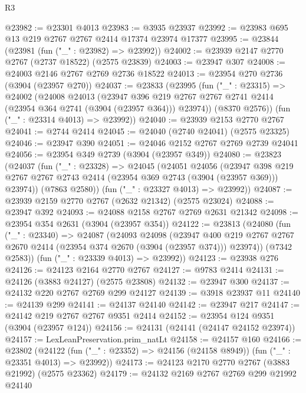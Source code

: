 \begin{lexlean}{R3}
\begin{coremodule}
@23982 := @23301 @4013
@23983 := @3935 @23937
@23992 := @23983 @695 @13 @219 @2767 @2767 @2414 @17374 @23974 @17377
@23995 := @23844 (@23981 (fun ("_" : @23982) => @23992))
@24002 := @23939 @2147 @2770 @2767 (@2737 @18522) (@2575 @23839)
@24003 := @23947 @307
@24008 := @24003 @2146 @2767 @2769 @2736 @18522
@24013 := @23954 @270 @2736 (@3904 (@23957 @270))
@24037 := @23833
    (@23995
      (fun ("_" : @23315) =>
      @24002
        (@24008
          @24013
          (@23947
            @396
            @219
            @2767
            @2767
            @2741
            @2414
            (@23954 @364 @2741 (@3904 (@23957 @364)))
            @23974))
        (@8370 @2576))
      (fun ("_" : @23314 @4013) => @23992))
@24040 := @23939 @2153 @2770 @2767
@24041 := @2744 @2414
@24045 := @24040 (@2740 @24041) (@2575 @23325)
@24046 := @23947 @390
@24051 := @24046 @2152 @2767 @2769 @2739 @24041
@24056 := @23954 @349 @2739 (@3904 (@23957 @349))
@24080 := @23823
    (@24037
      (fun ("_" : @23328) =>
      @24045
        (@24051
          @24056
          (@23947
            @398
            @219
            @2767
            @2767
            @2743
            @2414
            (@23954 @369 @2743 (@3904 (@23957 @369)))
            @23974))
        (@7863 @2580))
      (fun ("_" : @23327 @4013) => @23992))
@24087 := @23939 @2159 @2770 @2767 (@2632 @21342) (@2575 @23024)
@24088 := @23947 @392
@24093 := @24088 @2158 @2767 @2769 @2631 @21342
@24098 := @23954 @354 @2631 (@3904 (@23957 @354))
@24122 := @23813
    (@24080
      (fun ("_" : @23340) =>
      @24087
        (@24093
          @24098
          (@23947
            @400
            @219
            @2767
            @2767
            @2670
            @2414
            (@23954 @374 @2670 (@3904 (@23957 @374)))
            @23974))
        (@7342 @2583))
      (fun ("_" : @23339 @4013) => @23992))
@24123 := @23938 @276
@24126 := @24123 @2164 @2770 @2767
@24127 := @9783 @2414
@24131 := @24126 (@3883 @24127) (@2575 @23808)
@24132 := @23947 @300
@24137 := @24132 @220 @2767 @2769 @299 @24127
@24139 := @3918 @23937 @11
@24140 := @24139 @299
@24141 := @24137 @24140
@24142 := @23947 @217
@24147 := @24142 @219 @2767 @2767 @9351 @2414
@24152 := @23954 @124 @9351 (@3904 (@23957 @124))
@24156 := @24131 (@24141 (@24147 @24152 @23974))
@24157 := LexLeanPreservation.prim_natLt
@24158 := @24157 @160
@24166 := @23802
    (@24122 (fun ("_" : @23352) => @24156 (@24158 @8949)) (fun ("_" : @23351 @4013) => @23992))
@24173 := @24123 @2170 @2770 @2767 (@3883 @21992) (@2575 @23362)
@24179 := @24132 @2169 @2767 @2769 @299 @21992 @24140

\end{coremodule}
\end{lexlean}
